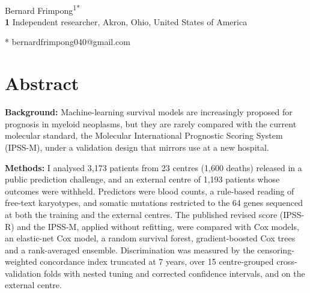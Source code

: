 \documentclass[10pt,letterpaper]{article}
\begin{document}
\vspace*{0.2in}

\begin{flushleft}
{\Large
\textbf{} %
}
\newline
\\
Bernard Frimpong\textsuperscript{1*}
\\
\bigskip
\textbf{1} Independent researcher, Akron, Ohio, United States of America
\\
\bigskip

* bernardfrimpong040@gmail.com

\end{flushleft}
\section*{Abstract}
\textbf{Background:} Machine-learning survival models are increasingly proposed for
prognosis in myeloid neoplasms, but they are rarely compared with the current molecular
standard, the Molecular International Prognostic Scoring System (IPSS-M), under a
validation design that mirrors use at a new hospital.

\textbf{Methods:} I analysed 3,173 patients from 23 centres (1,600 deaths) released in a
public prediction challenge, and an external centre of 1,193 patients whose outcomes were
withheld. Predictors were blood counts, a rule-based reading of free-text karyotypes, and
somatic mutations restricted to the 64 genes sequenced at both the training and the
external centres. The published revised score (IPSS-R) and the IPSS-M, applied without
refitting, were compared with Cox models, an elastic-net Cox model, a random survival
forest, gradient-boosted Cox trees and a rank-averaged ensemble. Discrimination was
measured by the censoring-weighted concordance index truncated at 7 years, over 15
centre-grouped cross-validation folds with nested tuning and corrected confidence
intervals, and on the external centre.
\end{document}
